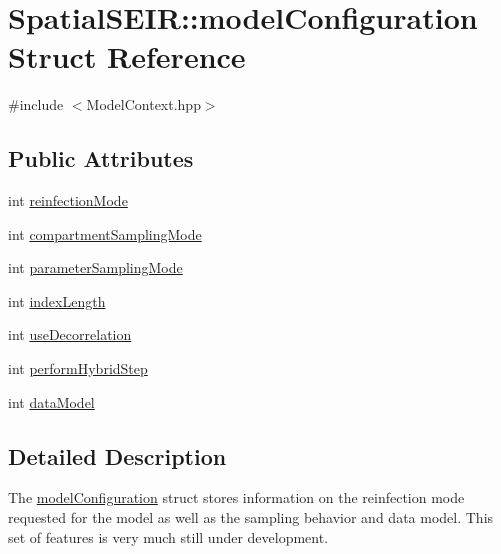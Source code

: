 \hypertarget{structSpatialSEIR_1_1modelConfiguration}{\section{Spatial\-S\-E\-I\-R\-:\-:model\-Configuration Struct Reference}
\label{structSpatialSEIR_1_1modelConfiguration}
}


{\ttfamily \#include $<$Model\-Context.\-hpp$>$}

\subsection*{Public Attributes}
\begin{DoxyCompactItemize}
\item 
int \hyperlink{structSpatialSEIR_1_1modelConfiguration_a14311a125d9d1f81988468d7c7cab053}{reinfection\-Mode}
\item 
int \hyperlink{structSpatialSEIR_1_1modelConfiguration_ad1c1d1f892bda73f6c039013eaa507fe}{compartment\-Sampling\-Mode}
\item 
int \hyperlink{structSpatialSEIR_1_1modelConfiguration_a77124442818744ed7201f5345f7d5592}{parameter\-Sampling\-Mode}
\item 
int \hyperlink{structSpatialSEIR_1_1modelConfiguration_a61296ec50b9020b198d9630cef4f4b3e}{index\-Length}
\item 
int \hyperlink{structSpatialSEIR_1_1modelConfiguration_aadf8335bc1ebcd6cef1b21259fe35582}{use\-Decorrelation}
\item 
int \hyperlink{structSpatialSEIR_1_1modelConfiguration_a20497edc9d383569d5b1432bdd41fd54}{perform\-Hybrid\-Step}
\item 
int \hyperlink{structSpatialSEIR_1_1modelConfiguration_aecfb1421025e725f13945049e00298ff}{data\-Model}
\end{DoxyCompactItemize}


\subsection{Detailed Description}
The \hyperlink{structSpatialSEIR_1_1modelConfiguration}{model\-Configuration} struct stores information on the reinfection mode requested for the model as well as the sampling behavior and data model. This set of features is very much still under development. 

